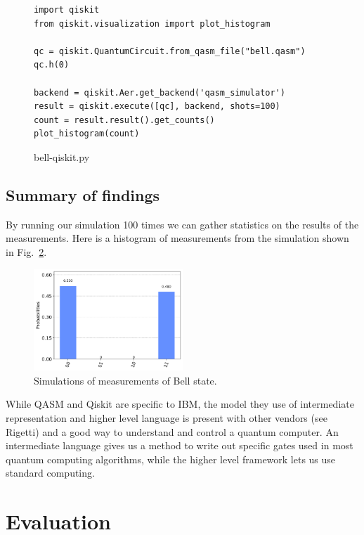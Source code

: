 \documentclass{article}
\begin{document}
\begin{samepage}
\begin{figure}[htbp]
\begin{verbatim}
import qiskit
from qiskit.visualization import plot_histogram

qc = qiskit.QuantumCircuit.from_qasm_file("bell.qasm")
qc.h(0)

backend = qiskit.Aer.get_backend('qasm_simulator')
result = qiskit.execute([qc], backend, shots=100)
count = result.result().get_counts()
plot_histogram(count)
\end{verbatim}
\caption{bell-qiskit.py}
\label{fig:qiskit}
\end{figure}
\end{samepage}

\subsection{Summary of findings}
By running our simulation 100 times we can gather statistics on the results of the measurements. Here is a histogram of measurements from the simulation shown in Fig.~\ref{fig:results}.

\begin{figure}[H]
    \centering
    \includegraphics[width=0.5\textwidth]{histogram.png}
    \caption{Simulations of measurements of Bell state.}
    \label{fig:results}
\end{figure}

While QASM and Qiskit are specific to IBM, the model they use of intermediate representation and higher level language is present with other vendors (see Rigetti) and a good way to understand and control a quantum computer. An intermediate language gives us a method to write out specific gates used in most quantum computing algorithms, while the higher level framework lets us use standard computing. 


\section{Evaluation}
\end{document}

